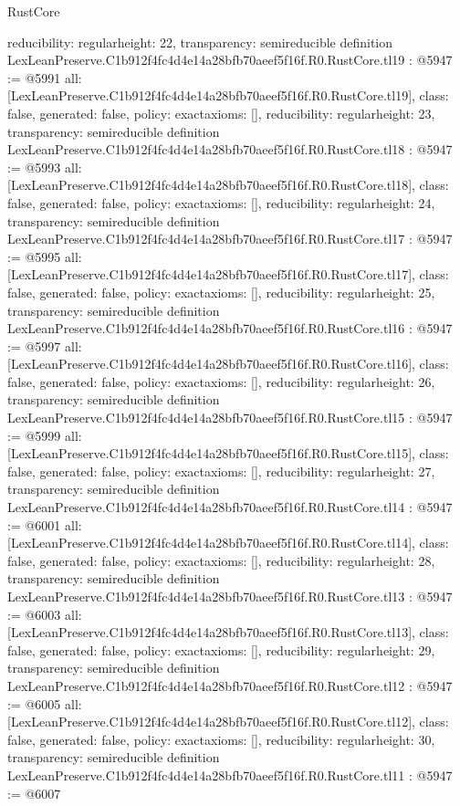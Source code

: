 \begin{lexlean}{RustCore}
\begin{coremodule}
{  reducibility: regular{height: 22},
  transparency: semireducible
}
definition LexLeanPreserve.C1b912f4fc4d4e14a28bfb70aeef5f16f.R0.RustCore.tl19 : @5947 := @5991 {
  all: [LexLeanPreserve.C1b912f4fc4d4e14a28bfb70aeef5f16f.R0.RustCore.tl19],
  class: false,
  generated: false,
  policy: exact{axioms: []},
  reducibility: regular{height: 23},
  transparency: semireducible
}
definition LexLeanPreserve.C1b912f4fc4d4e14a28bfb70aeef5f16f.R0.RustCore.tl18 : @5947 := @5993 {
  all: [LexLeanPreserve.C1b912f4fc4d4e14a28bfb70aeef5f16f.R0.RustCore.tl18],
  class: false,
  generated: false,
  policy: exact{axioms: []},
  reducibility: regular{height: 24},
  transparency: semireducible
}
definition LexLeanPreserve.C1b912f4fc4d4e14a28bfb70aeef5f16f.R0.RustCore.tl17 : @5947 := @5995 {
  all: [LexLeanPreserve.C1b912f4fc4d4e14a28bfb70aeef5f16f.R0.RustCore.tl17],
  class: false,
  generated: false,
  policy: exact{axioms: []},
  reducibility: regular{height: 25},
  transparency: semireducible
}
definition LexLeanPreserve.C1b912f4fc4d4e14a28bfb70aeef5f16f.R0.RustCore.tl16 : @5947 := @5997 {
  all: [LexLeanPreserve.C1b912f4fc4d4e14a28bfb70aeef5f16f.R0.RustCore.tl16],
  class: false,
  generated: false,
  policy: exact{axioms: []},
  reducibility: regular{height: 26},
  transparency: semireducible
}
definition LexLeanPreserve.C1b912f4fc4d4e14a28bfb70aeef5f16f.R0.RustCore.tl15 : @5947 := @5999 {
  all: [LexLeanPreserve.C1b912f4fc4d4e14a28bfb70aeef5f16f.R0.RustCore.tl15],
  class: false,
  generated: false,
  policy: exact{axioms: []},
  reducibility: regular{height: 27},
  transparency: semireducible
}
definition LexLeanPreserve.C1b912f4fc4d4e14a28bfb70aeef5f16f.R0.RustCore.tl14 : @5947 := @6001 {
  all: [LexLeanPreserve.C1b912f4fc4d4e14a28bfb70aeef5f16f.R0.RustCore.tl14],
  class: false,
  generated: false,
  policy: exact{axioms: []},
  reducibility: regular{height: 28},
  transparency: semireducible
}
definition LexLeanPreserve.C1b912f4fc4d4e14a28bfb70aeef5f16f.R0.RustCore.tl13 : @5947 := @6003 {
  all: [LexLeanPreserve.C1b912f4fc4d4e14a28bfb70aeef5f16f.R0.RustCore.tl13],
  class: false,
  generated: false,
  policy: exact{axioms: []},
  reducibility: regular{height: 29},
  transparency: semireducible
}
definition LexLeanPreserve.C1b912f4fc4d4e14a28bfb70aeef5f16f.R0.RustCore.tl12 : @5947 := @6005 {
  all: [LexLeanPreserve.C1b912f4fc4d4e14a28bfb70aeef5f16f.R0.RustCore.tl12],
  class: false,
  generated: false,
  policy: exact{axioms: []},
  reducibility: regular{height: 30},
  transparency: semireducible
}
definition LexLeanPreserve.C1b912f4fc4d4e14a28bfb70aeef5f16f.R0.RustCore.tl11 : @5947 := @6007 {
}
\end{coremodule}
\end{lexlean}
